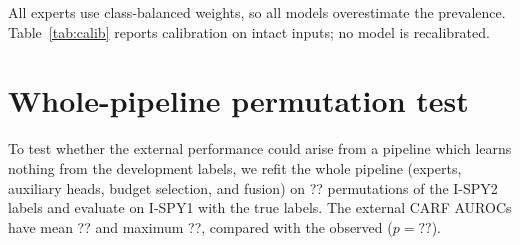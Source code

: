 \documentclass[a4paper,runningheads]{llncs}
\providecommand{\PermMaxCarf}{??}\providecommand{\NPerm}{??}\providecommand{\PermPCarf}{??}\providecommand{\PermMeanCarf}{??}
\begin{document}
All experts use class-balanced weights, so all models overestimate the prevalence. Table~\ref{tab:calib} reports calibration on intact inputs; no model is recalibrated.

\begin{table}[h]
\centering
\caption{Calibration on intact inputs (lower is better).}
\label{tab:calib}
\small
{}
\end{table}

\section{Whole-pipeline permutation test}

To test whether the external performance could arise from a pipeline which learns nothing from the development labels, we refit the whole pipeline (experts, auxiliary heads, budget selection, and fusion) on \NPerm{} permutations of the I-SPY2 labels and evaluate on I-SPY1 with the true labels. The external CARF AUROCs have mean \PermMeanCarf{} and maximum \PermMaxCarf{}, compared with the observed \ExtCarfTwo{} ($p=\PermPCarf$).



\end{document}

